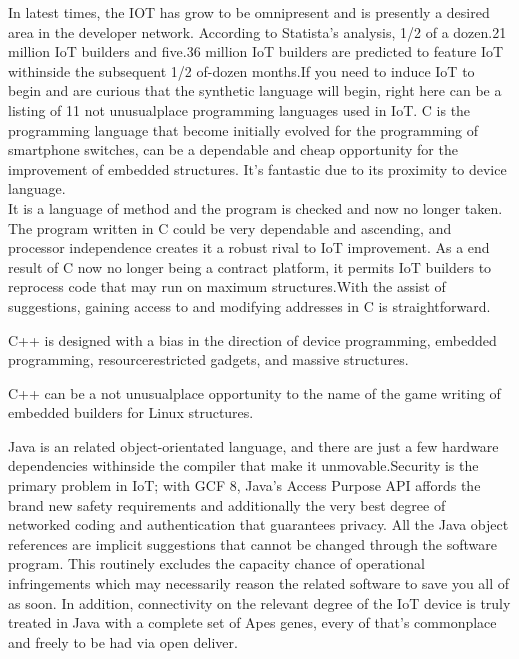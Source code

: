 \documentclass[12pt,a4paper]{article}
\begin{document}
In latest times, the IOT has grow to be omnipresent and is presently a desired
area in the developer network. According to Statista’s analysis, 1/2 of a dozen.21 million
IoT builders and five.36 million IoT builders are predicted to feature IoT withinside the subsequent 1/2 of-dozen
months.If you need to induce IoT to begin and are curious that the synthetic language will begin,
right here can be a listing of 11 not unusualplace programming languages used in IoT. C is the programming language that
become initially evolved for the programming of smartphone switches, can be a dependable and cheap
opportunity for the improvement of embedded structures. It’s fantastic due to its proximity
to device language.\\

It is a language of method and the program is checked and now no longer taken. The program written
in C could be very dependable and ascending, and processor independence creates it a robust rival to IoT
improvement. As a end result of C now no longer being a contract platform, it permits IoT builders to
reprocess code that may run on maximum structures.With the assist of suggestions, gaining access to and modifying
addresses in C is straightforward.

C++ is designed with a bias in the direction of device programming, embedded programming, resourcerestricted gadgets, and massive structures.

C++ can be a not unusualplace opportunity to the name of the game writing of embedded builders for Linux
structures.

Java is an related object-orientated language, and there are just a few hardware dependencies withinside the compiler that make it unmovable.Security is the primary problem in IoT; with GCF 8, Java’s Access Purpose API affords the brand new safety requirements and additionally the very best degree of networked coding and authentication that guarantees privacy.
All the Java object references are implicit suggestions that cannot be changed through the software program. This routinely excludes the capacity chance of operational infringements which may
necessarily reason the related software to save you all of as soon. In addition, connectivity
on the relevant degree of the IoT device is truly treated in Java with a complete set of
Apes genes, every of that's commonplace and freely to be had via open deliver.
\end{document}
